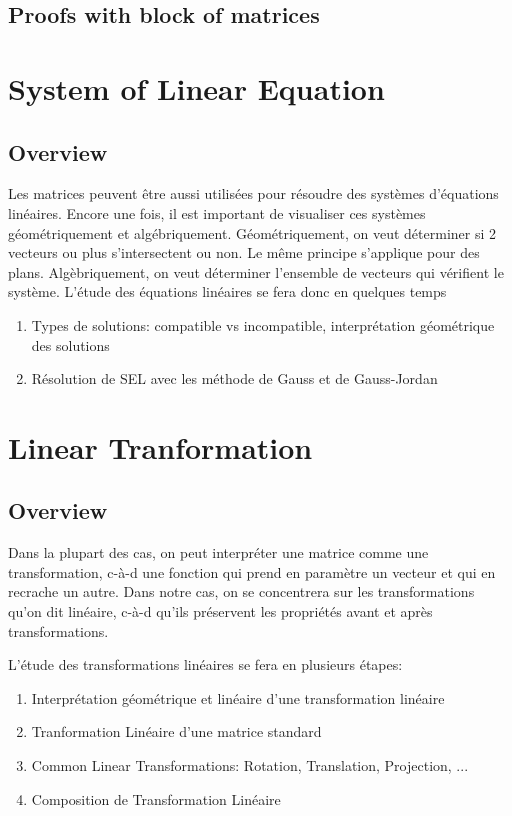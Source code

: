 \documentclass{article}
\begin{document}
\subsection{Proofs with block of matrices}%
\label{sub:Proofs with block of matrices}

\section{System of Linear Equation}

\subsection{Overview}%
\label{sub:Overview}

Les matrices peuvent être aussi utilisées pour résoudre des systèmes d'équations
linéaires. Encore une fois, il est important de visualiser ces systèmes
géométriquement et algébriquement. Géométriquement, on veut déterminer
si 2 vecteurs ou plus s'intersectent ou non. Le même principe s'applique pour
des plans. Algèbriquement, on veut déterminer l'ensemble de vecteurs qui
vérifient le système. L'étude des équations linéaires se fera donc en quelques
temps
\begin{enumerate}
    \item Types de solutions: compatible vs incompatible, interprétation
	géométrique des solutions
    \item Résolution de SEL avec les méthode de Gauss et de Gauss-Jordan
\end{enumerate}

\section{Linear Tranformation}

\subsection{Overview}%
\label{sub:Overview}

Dans la plupart des cas, on peut interpréter une matrice comme une
transformation, c-à-d une fonction qui prend en paramètre un vecteur et qui
en recrache un autre. Dans notre cas, on se concentrera sur les transformations
qu'on dit linéaire, c-à-d qu'ils préservent les propriétés avant et après
transformations.

L'étude des transformations linéaires se fera en plusieurs étapes:
\begin{enumerate}
    \item Interprétation géométrique et linéaire d'une transformation linéaire
    \item Tranformation Linéaire d'une matrice standard
    \item Common Linear Transformations: Rotation, Translation, Projection, ...
    \item Composition de Transformation Linéaire
\end{enumerate}
\end{document}

